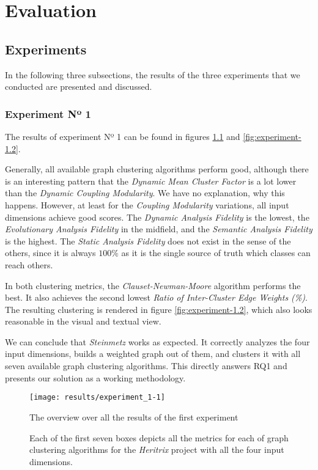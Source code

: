 \documentclass[12pt,a4paper]{report}
\begin{document}
\chapter{Evaluation} \label{chap:evaluation}

\section{Experiments}

In the following three subsections, the results of the three experiments
that we conducted are presented and discussed.


\subsection{Experiment Nº 1}

The results of experiment Nº 1 can be found in figures
\ref{fig:experiment-1.1} and \ref{fig:experiment-1.2}.

Generally, all available graph clustering algorithms perform good, although
there is an interesting pattern that the \textit{Dynamic Mean Cluster Factor} is
a lot lower than the \textit{Dynamic Coupling Modularity}. We have no explanation,
why this happens. However, at least for the \textit{Coupling Modularity} variations,
all input dimensions achieve good scores.
The \textit{Dynamic Analysis Fidelity} is the lowest,
the \textit{Evolutionary Analysis Fidelity} in the midfield,
and the \textit{Semantic Analysis Fidelity} is the highest.
The \textit{Static Analysis Fidelity} does not exist in the sense of the others,
since it is always $100\%$ as it is the single source of truth which classes can
reach others.

In both clustering metrics, the \textit{Clauset-Newman-Moore} algorithm performs
the best. It also achieves the second lowest \textit{Ratio of Inter-Cluster Edge Weights (\%)}.
The resulting clustering is rendered in figure \ref{fig:experiment-1.2},
which also looks reasonable in the visual and textual view.

We can conclude that \textit{Steinmetz} works as expected.
It correctly analyzes the four input dimensions, builds a weighted graph out of them,
and clusters it with all seven available graph clustering algorithms.
This directly answers RQ1 and presents our solution as a working methodology.

\begin{figure}[htbp]
\centering
\texttt{[image: results/experiment\_1-1]}
\caption{The overview over all the results of the first experiment}
\caption*{\centering
  Each of the first seven boxes depicts all the metrics for each of graph clustering algorithms for the \textit{Heritrix} project with all the four input dimensions.
}
\label{fig:experiment-1.1}
\end{figure}
\end{document}
